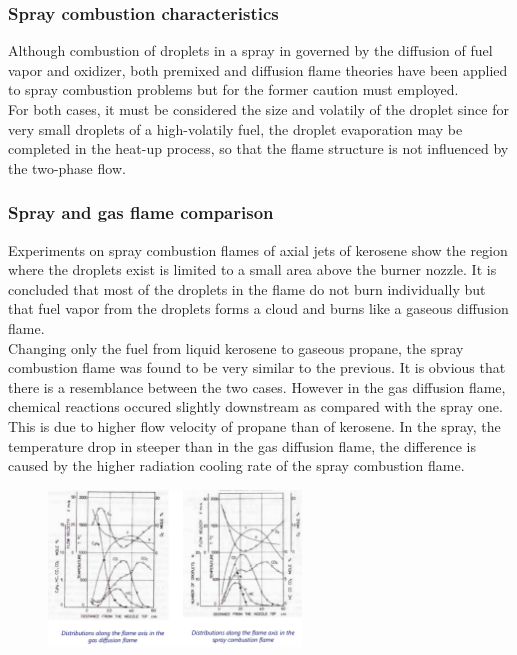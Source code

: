 \documentclass[12pt]{article}
\begin{document}
\subsubsection{Spray combustion characteristics}

Although combustion of droplets in a spray in governed by the diffusion of fuel vapor and oxidizer, both premixed and diffusion flame theories have been applied to spray combustion problems but for the former caution must employed.\\ For both cases, it must be considered the size and volatily of the droplet since for very small droplets of a high-volatily fuel, the droplet evaporation may be completed in the heat-up process, so that the flame structure is not influenced by the two-phase flow.

\subsubsection{Spray and gas flame comparison}

Experiments on spray combustion flames of axial jets of kerosene show the region where the droplets exist is limited to a small area above the burner nozzle. It is concluded that most of the droplets in the flame do not burn individually but that fuel vapor from the droplets forms a cloud and burns like a gaseous diffusion flame.\\ Changing only the fuel from liquid kerosene to gaseous propane, the spray combustion flame was found to be very similar to the previous. It is obvious that there is a resemblance between the two cases. However in the gas diffusion flame, chemical reactions occured slightly downstream as compared with the spray one. This is due to higher flow velocity of propane than of kerosene. In the spray, the temperature drop in steeper than in the gas diffusion flame, the difference is caused by the higher radiation cooling rate of the spray combustion flame.

\begin{figure}[h!]
\centering
\includegraphics[width=0.6\textwidth]{figures/spraygas.png}
\end{figure}
\end{document}
